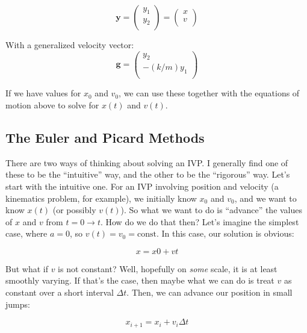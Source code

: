 \documentclass{article}
\theoremstyle{demo}
\begin{document}
\begin{equation}
    \mathbf{y} = 
    \begin{pmatrix}
        y_1 \\
        y_2 \\
    \end{pmatrix}
    =
    \begin{pmatrix}
        x \\
        v \\
    \end{pmatrix}
\end{equation}

With a generalized velocity vector:
\begin{equation}
    \mathbf{g} = 
    \begin{pmatrix}
        y_2 \\
        -(k/m)y_1 \\
    \end{pmatrix}
\end{equation}

If we have values for $x_0$ and $v_0$, we can use these together with the
equations of motion above to solve for $x(t)$ and $v(t)$.

\subsection{The Euler and Picard Methods}
There are two ways of thinking about solving an IVP.  I generally find one of
these to be the ``intuitive'' way, and the other to be the ``rigorous'' way.
Let's start with the intuitive one.  For an IVP involving position and velocity
(a kinematics problem, for example), we initially know $x_0$ and $v_0$, and we
want to know $x(t)$ (or possibly $v(t)$).  So what we want to do is ``advance''
the values of $x$ and $v$ from $t=0\rightarrow t$.  How do we do that then?
Let's imagine the simplest case, where $a=0$, so $v(t)=v_0=\mathrm{const}$.  In
this case, our solution is obvious:

\begin{equation}
    x = x0 + vt
\end{equation}

But what if $v$ is not constant?  Well, hopefully on \textit{some} scale, it is
at least smoothly varying.  If that's the case, then maybe what we can do is
treat $v$ as constant over a short interval $\Delta t$.  Then, we can advance
our position in small jumps:

\begin{equation}
    x_{i+1} = x_i + v_i \Delta t
\end{equation}
\end{document}
